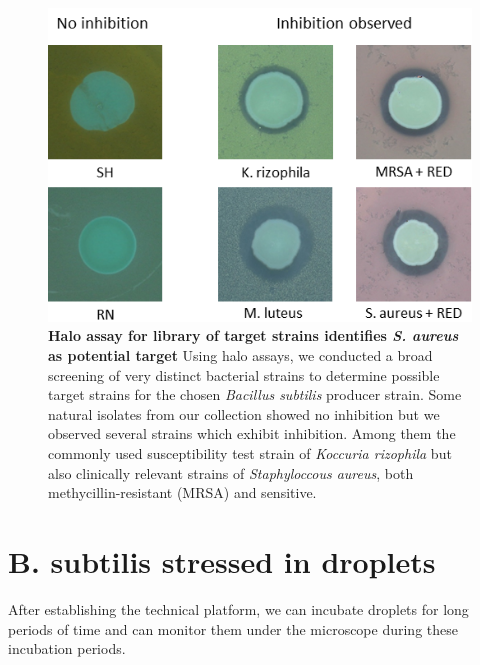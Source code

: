 \begin{figure}
\centering
\includegraphics[width=\linewidth]{graphics/2025_09_28_droplets_fig4.png}
\caption{\textbf{Halo assay for library of target strains identifies \textit{S. aureus} as potential target} Using halo assays, we conducted a broad screening of very distinct bacterial strains to determine possible target strains for the chosen \textit{Bacillus subtilis} producer strain. Some natural isolates from our collection showed no inhibition but we observed several strains which exhibit inhibition. Among them the commonly used susceptibility test strain of \textit{Koccuria rizophila} but also clinically relevant strains of \textit{Staphyloccous aureus}, both methycillin-resistant (MRSA) and sensitive.}
\label{fig:results_sensitive_screening}
\end{figure}

\section{B. subtilis stressed in droplets}
After establishing the technical platform, we can incubate droplets for long periods of time and can monitor them under the microscope during these incubation periods.


